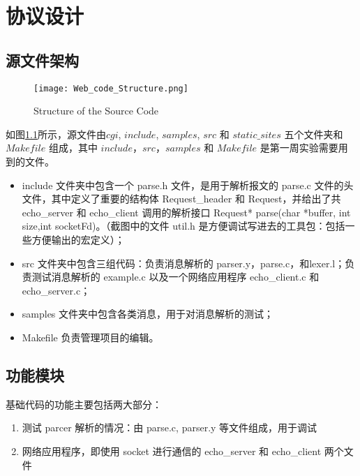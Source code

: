 \chapter{协议设计}

\section{源文件架构}

\begin{figure}[htbp!]
    \centering
    \texttt{[image: Web\_code\_Structure.png]}
    \caption{Structure of the Source Code}\label{fig:Web_code_structure}
    \vspace{-1em}
\end{figure}

如图\ref{fig:Web_code_structure}所示，源文件由$cgi$, $include$, $samples$, $src$ 和 $static\_sites$ 五个文件夹和 $Makefile$ 组成，其中 $include$，$src$，$samples$ 和 $Makefile$ 是第一周实验需要用到的文件。

\begin{itemize}
    \item include 文件夹中包含一个 parse.h 文件，是用于解析报文的 parse.c 文件的头文件，其中定义了重要的结构体 Request\_header 和 Request，并给出了共 echo\_server 和 echo\_client 调用的解析接口 Request* parse(char *buffer, int size,int socketFd)。（截图中的文件 util.h 是方便调试写进去的工具包：包括一些方便输出的宏定义）；

    \item src 文件夹中包含三组代码：负责消息解析的 parser.y，parse.c，和lexer.l；负责测试消息解析的 example.c 以及一个网络应用程序 echo\_client.c 和 echo\_server.c；
    
    \item samples 文件夹中包含各类消息，用于对消息解析的测试；
    
    \item Makefile 负责管理项目的编辑。

\end{itemize}


\section{功能模块}

基础代码的功能主要包括两大部分：
\begin{enumerate}
    \item 测试 parcer 解析的情况：由 parse.c, parser.y 等文件组成，用于调试
    \item 网络应用程序，即使用 socket 进行通信的 echo\_server 和 echo\_client 两个文件
\end{enumerate}

